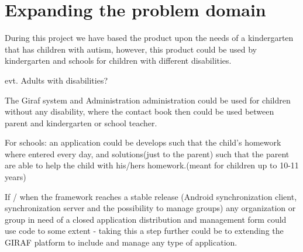 \section{Expanding the problem domain}

During this project we have based the product upon the needs of a kindergarten that has children with autism, however, this product could be used by kindergarten and schools for children with different disabilities.

evt. Adults with disabilities?

The Giraf system and Administration administration could be used for children without any disability, where the contact book then could be used between parent and kindergarten or school teacher. 

For schools: an application could be develops such that the child's homework where entered every day, and solutions(just to the parent) such that the parent are able to help the child with his/hers homework.(meant for children up to 10-11 years)


If / when the framework reaches a stable release (Android synchronization client, synchronization server and the possibility to manage groups) any organization or group in need of a closed application distribution and management form could use code to some extent - taking this a step further could be to extending the GIRAF platform to include and manage any type of application. 

    
